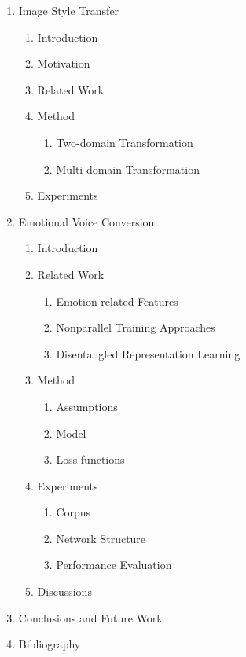 \documentclass{article}
\begin{document}
\begin{enumerate}
    \item Image Style Transfer
    \begin{enumerate}
    	\item Introduction
        \item Motivation
        \item Related Work
        \item Method
        \begin{enumerate}
          \item Two-domain Transformation
          \item Multi-domain Transformation
        \end{enumerate}
        \item Experiments
    \end{enumerate}
    
    \item Emotional Voice Conversion
    \begin{enumerate}
    	\item Introduction
        \item Related Work
        \begin{enumerate}
            \item Emotion-related Features
            \item Nonparallel Training Approaches
            \item Disentangled Representation Learning
        \end{enumerate}
        
        \item Method
        \begin{enumerate}
          \item Assumptions
          \item Model
          \item Loss functions
        \end{enumerate}
        \item Experiments
        \begin{enumerate}
          \item Corpus
          \item Network Structure
          \item Performance Evaluation
        \end{enumerate}
        \item Discussions
    \end{enumerate}
   
    \item Conclusions and Future Work
    \item[] Bibliography
\end{enumerate}
\end{document}
